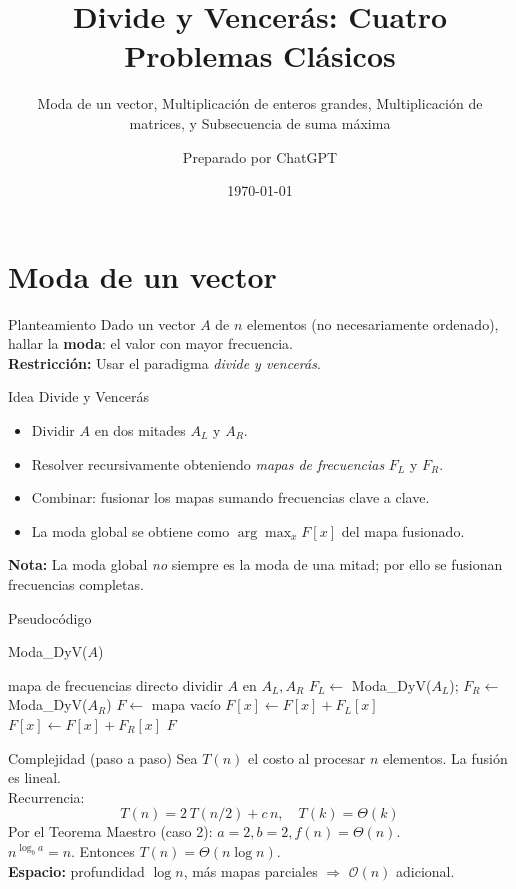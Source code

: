 \documentclass[aspectratio=169]{beamer}
\title{Divide y Vencerás: Cuatro Problemas Clásicos}
\subtitle{Moda de un vector, Multiplicación de enteros grandes, Multiplicación de matrices, y Subsecuencia de suma máxima}
\author{Preparado por ChatGPT}
\date{\today}
\begin{document}
\begin{frame}
  \titlepage
\end{frame}

\section{Moda de un vector}
\begin{frame}{Planteamiento}
Dado un vector $A$ de $n$ elementos (no necesariamente ordenado), hallar la \textbf{moda}: el valor con mayor frecuencia.\\[1ex]
\textbf{Restricción:} Usar el paradigma \emph{divide y vencerás}.
\end{frame}

\begin{frame}{Idea Divide y Vencerás}
\begin{itemize}
  \item Dividir $A$ en dos mitades $A_L$ y $A_R$.
  \item Resolver recursivamente obteniendo \emph{mapas de frecuencias} $F_L$ y $F_R$.
  \item Combinar: fusionar los mapas sumando frecuencias clave a clave.
  \item La moda global se obtiene como $\arg\max_x F[x]$ del mapa fusionado.
\end{itemize}
\textbf{Nota:} La moda global \emph{no} siempre es la moda de una mitad; por ello se fusionan frecuencias completas.
\end{frame}

\begin{frame}{Pseudocódigo}
\begin{algorithm}[H]
\caption{Moda\_DyV($A$)}
\begin{algorithmic}[1]
 
  \State \Return mapa de frecuencias directo
\EndIf
\State dividir $A$ en $A_L, A_R$
\State $F_L \gets$ Moda\_DyV($A_L$); \quad $F_R \gets$ Moda\_DyV($A_R$)
\State $F \gets$ mapa vacío
 $F[x] \gets F[x] + F_L[x]$
\EndFor
{} $F[x] \gets F[x] + F_R[x]$
\EndFor
\State \Return $F$ 
\end{algorithmic}
\end{algorithm}
\end{frame}

\begin{frame}{Complejidad (paso a paso)}
Sea $T(n)$ el costo al procesar $n$ elementos. La fusión es lineal.\\[1ex]
Recurrencia:
\[ T(n) = 2\,T(n/2) + c\,n, \quad T(k)=\Theta(k)\]
Por el Teorema Maestro (caso 2): $a{=}2, b{=}2, f(n){=}\Theta(n)$.\\
$n^{\log_b a} = n$. Entonces $T(n) = \Theta(n\log n)$.\\[1ex]
\textbf{Espacio:} profundidad $\log n$, más mapas parciales $\Rightarrow$ $\mathcal{O}(n)$ adicional.
\end{frame}
\end{document}
